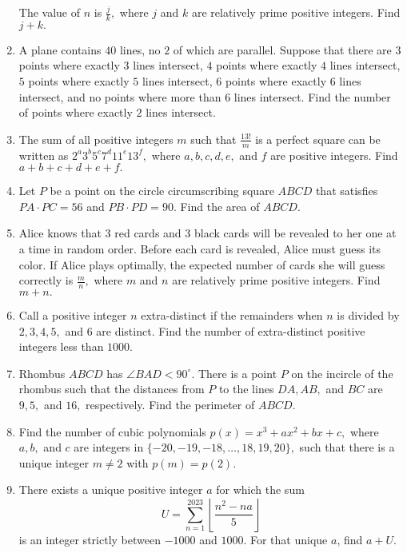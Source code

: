 \documentclass{article}
\begin{document}
\begin{enumerate}[label=\arabic*., itemsep=0.5em]
 The value of $n$ is $\frac{j}{k},$ where $j$ and $k$ are relatively prime positive integers. Find $j+k.$\par \vspace{0.5em}\item A plane contains $40$ lines, no $2$ of which are parallel. Suppose that there are $3$ points where exactly $3$ lines intersect, $4$ points where exactly $4$ lines intersect, $5$ points where exactly $5$ lines intersect, $6$ points where exactly $6$ lines intersect, and no points where more than $6$ lines intersect. Find the number of points where exactly $2$ lines intersect.\par \vspace{0.5em}\item The sum of all positive integers $m$ such that $\frac{13!}{m}$ is a perfect square can be written as $2^a3^b5^c7^d11^e13^f,$ where $a,b,c,d,e,$ and $f$ are positive integers. Find $a+b+c+d+e+f.$\par \vspace{0.5em}\item Let $P$ be a point on the circle circumscribing square $ABCD$ that satisfies $PA \cdot PC = 56$ and $PB \cdot PD = 90.$ Find the area of $ABCD.$\par \vspace{0.5em}\item Alice knows that $3$ red cards and $3$ black cards will be revealed to her one at a time in random order. Before each card is revealed, Alice must guess its color. If Alice plays optimally, the expected number of cards she will guess correctly is $\frac{m}{n},$ where $m$ and $n$ are relatively prime positive integers. Find $m+n.$\par \vspace{0.5em}\item Call a positive integer $n$ extra-distinct if the remainders when $n$ is divided by $2, 3, 4, 5,$ and $6$ are distinct. Find the number of extra-distinct positive integers less than $1000$.\par \vspace{0.5em}\item Rhombus $ABCD$ has $\angle BAD < 90^\circ.$ There is a point $P$ on the incircle of the rhombus such that the distances from $P$ to the lines $DA,AB,$ and $BC$ are $9,5,$ and $16,$ respectively. Find the perimeter of $ABCD.$\par \vspace{0.5em}\item Find the number of cubic polynomials $p(x) = x^3 + ax^2 + bx + c,$ where $a, b,$ and $c$ are integers in $\{-20,-19,-18,\ldots,18,19,20\},$ such that there is a unique integer $m \not= 2$ with $p(m) = p(2).$\par \vspace{0.5em}\item There exists a unique positive integer $a$ for which the sum 
\begin{equation*}
U=\sum_{n=1}^{2023}\left\lfloor\dfrac{n^{2}-na}{5}\right\rfloor
\end{equation*}
 is an integer strictly between $-1000$ and $1000$. For that unique $a$, find $a+U$.


\end{enumerate}
\end{document}
